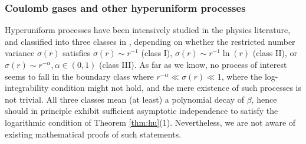 \documentclass[12pt]{article}
\newcommand{\1}{\mathbf{1}}
\begin{document}
{{{{%

\subsubsection{Coulomb gases and other hyperuniform processes}


Hyperuniform processes have been intensively studied in the physics literature, and classified into three classes in  \cite{torquato2018hyperuniform}, depending on whether the restricted number variance $\sigma (r)$ satisfies $ \sigma (r)\sim r^{- 1}$  (class I), $\sigma (r)\sim r^{- 1}\ln(r)$ (class II), or $ \sigma (r)\sim r^{-\alpha },\alpha \in (0, 1)$ (class III).  {As far as we know,} no process of interest seems to fall in the boundary class where $r^{-\alpha }\ll \sigma (r) \ll 1$, where the  {log}-integrability condition might not hold, and the mere existence of such processes is not trivial. All three classes mean (at least) a polynomial decay {of $\beta$}, hence should in principle exhibit sufficient asymptotic independence to satisfy the logarithmic condition of Theorem \ref{thm:hu}(1). Nevertheless, we are not aware of existing mathematical proofs of such statements.

}}}}
\end{document}
